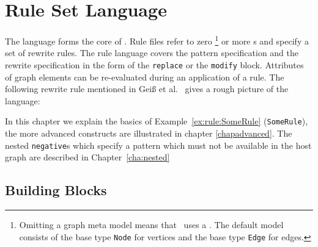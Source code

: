 \chapter{Rule Set Language}
\label{chaprulelang}

The  language forms the core of \GrG.
Rule files refer to zero
\footnote{Omitting a graph meta model means that \GrG\ uses a .
The default model consists of the base type \texttt{Node} for vertices and the base type \texttt{Edge} for edges.}
or more s and specify a set of rewrite rules.
The rule language covers the pattern specification and the rewrite specification in the form of the \texttt{replace} or the \texttt{modify} block.
Attributes of graph elements can be re-evaluated during an application of a rule.
The following rewrite rule mentioned in Geiß et al.~\cite{GBGHS:06} gives a rough picture of the language:
\begin{example}\label{ex:rule:SomeRule}
\end{example}
In this chapter we explain the basics of Example~\ref{ex:rule:SomeRule} (\texttt{SomeRule}),
the more advanced constructs are illustrated in chapter \ref{chapadvanced}.
The nested \texttt{negative}s which specify a pattern which must not be available in the host graph are described in Chapter~\ref{cha:nested}


\section{Building Blocks}
\label{rulebb}

